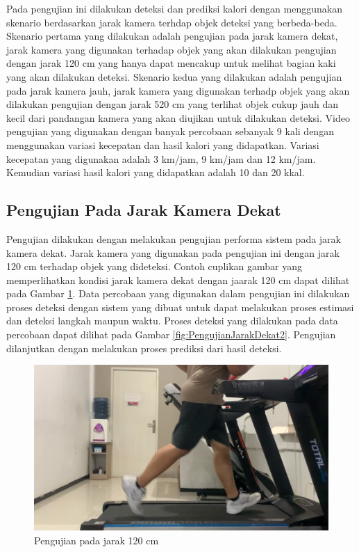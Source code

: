 Pada pengujian ini dilakukan deteksi dan prediksi kalori dengan menggunakan skenario berdasarkan jarak kamera terhdap objek deteksi yang berbeda-beda. Skenario pertama yang dilakukan adalah pengujian pada jarak kamera dekat, jarak kamera yang digunakan terhadap objek yang akan dilakukan pengujian dengan jarak 120 cm yang hanya dapat mencakup untuk melihat bagian kaki yang akan dilakukan deteksi. Skenario kedua yang dilakukan adalah pengujian pada jarak kamera jauh, jarak kamera yang digunakan terhadp objek yang akan dilakukan pengujian dengan jarak 520 cm yang terlihat objek cukup jauh dan kecil dari pandangan kamera yang akan diujikan untuk dilakukan deteksi. Video pengujian yang digunakan dengan banyak percobaan sebanyak 9 kali dengan menggunakan variasi kecepatan dan hasil kalori yang didapatkan. Variasi kecepatan yang digunakan adalah 3 km/jam, 9 km/jam dan 12 km/jam. Kemudian variasi hasil kalori yang didapatkan adalah 10 dan 20 kkal. 

\subsection{Pengujian Pada Jarak Kamera Dekat}
\label{subsec:PengujianJarakDekat}

Pengujian dilakukan dengan melakukan pengujian performa sistem pada jarak kamera dekat. Jarak kamera yang digunakan pada pengujian ini dengan jarak 120 cm terhadap objek yang dideteksi. Contoh cuplikan gambar yang memperlihatkan kondisi jarak kamera dekat dengan jaarak 120 cm dapat dilihat pada Gambar \ref{fig:PengujianJarakDekat}. Data percobaan yang digunakan dalam pengujian ini dilakukan proses deteksi dengan sistem yang dibuat untuk dapat melakukan proses estimasi dan deteksi langkah maupun waktu. Proses deteksi yang dilakukan pada data percobaan dapat dilihat pada Gambar \ref{fig:PengujianJarakDekat2}. Pengujian dilanjutkan dengan melakukan proses prediksi dari hasil deteksi.

\begin{figure}[H]
  \centering
  \includegraphics[scale=0.5]{gambar/jarak_dekat.png}
  \caption{Pengujian pada jarak 120 cm}
  \label{fig:PengujianJarakDekat}
\end{figure}

